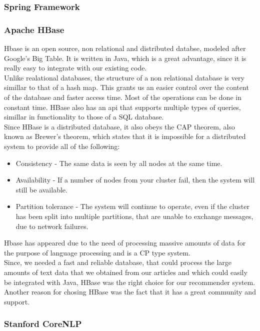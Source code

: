 \subsubsection{Spring Framework}
\label{sec:frameworks-hbase}

\subsubsection{Apache HBase}
\label{sec:frameworks-hbase}
Hbase is an open source, non relational and distributed databse, modeled after Google's Big Table. It is written in Java, which is a great advantage, since it is really easy to integrate with our existing code.
\\ Unlike realational databases, the structure of a non relational database is very simillar to that of a hash map. This grants us an easier control over the content of the database and faster access time. Most of the operations can be done in constant time. HBase also has an api that supports multiple types of queries, simillar in functionality to those of a SQL database.
\\ Since HBase is a distributed database, it also obeys the CAP theorem, also known as Brewer's theorem, which states that it is impossible for a distributed system to provide all of the following:

\begin{itemize}
	\item Consistency - The same data is seen by all nodes at the same time.
	\item Availability - If a number of nodes from your cluster fail, then the system will still be available.
	\item Partition tolerance - The system will continue to operate, even if the cluster has been split into multiple partitions, that are unable to exchange messages, due to network failures.
\end{itemize}

Hbase has appeared due to the need of processing massive amounts of data for the purpose of language processing and is a CP type system. 
\\ Since, we needed a fast and reliable database, that could process the large amounts of text data that we obtained from our articles and which could easily be integrated with Java, HBase was the right choice for our recommender system. Another reason for chosing HBase was the fact that it has a great community and support. 

\subsubsection{Stanford CoreNLP}
\label{sec:frameworks-stanford-corenlp}

